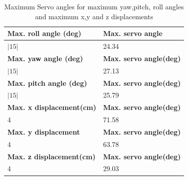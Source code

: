 \begin{center}
	\begin{table}[H]
		\centering
		\caption[Maximum Servo angles]{Maximum Servo angles for maximum yaw,pitch, roll angles and maximum x,y and z displacements}
		\label{roll}
		\centering
		\begin{tabular}{|l|l|}
			\hline
			\textbf{Max. roll angle (deg)}   & \textbf{Max. servo angle}      \\
			\hline
			$|15|$                           & 24.34                          \\
			\hline
			\textbf{Max. yaw angle (deg)}    & \textbf{Max. servo angle(deg)} \\
			\hline
			$|15|$                           & 27.13                          \\
			\hline
			\textbf{Max. pitch angle (deg)}  & \textbf{Max. servo angle(deg)} \\
			\hline
			$|15|$                           & 25.79                          \\
			\hline
			\textbf{Max. x displacement(cm)} & \textbf{Max. servo angle(deg)} \\
			\hline
			4                                & 71.58                          \\
			\hline
			\textbf{Max. y displacement}     & \textbf{Max. servo angle(deg)} \\
			\hline
			4                                & 63.78                          \\
			\hline
			\textbf{Max. z displacement(cm)} & \textbf{Max. servo angle(deg)} \\
			\hline
			4                                & 29.03                          \\
			\hline
		\end{tabular}
	\end{table}
\end{center}

